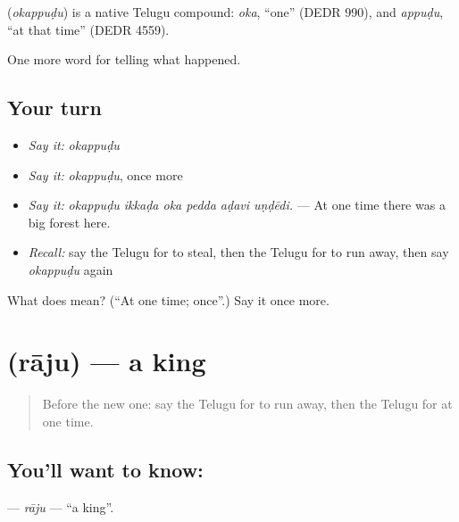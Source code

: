 \begin{cousinweb}
\textbf{} (\emph{okappuḍu}) is a native Telugu compound: \emph{oka}, \textquotedblleft{}one\textquotedblright{} (DEDR 990), and \emph{appuḍu}, \textquotedblleft{}at that time\textquotedblright{} (DEDR 4559).
\end{cousinweb}

\begin{grammarlens}[title={What you've built}]
One more word for telling what happened.
\end{grammarlens}

\subsection*{Your turn}
\begin{itemize}
\raggedright
  \item \emph{Say it:} \emph{okappuḍu}
  \item \emph{Say it:} \emph{okappuḍu}, once more
  \item \emph{Say it:} \emph{okappuḍu ikkaḍa oka pedda aḍavi uṇḍēdi.} — At one time there was a big forest here.
  \item \emph{Recall:} say the Telugu for to steal, then the Telugu for to run away, then say \emph{okappuḍu} again
\end{itemize}

\begin{tcolorbox}[breakable,colback=teal!4,colframe=teal!35!black,title={Before you move on}]
What does  mean? (\textquotedblleft{}At one time; once\textquotedblright{}.) Say it once more.
\end{tcolorbox}
\section[\texorpdfstring{\te{రాజు} (rāju)}{రాజు (rāju)}]{ (rāju) — a king}

\label{lesson:TE-C327-raju}



\begin{quote}
Before the new one: say the Telugu for to run away, then the Telugu for at one time.
\end{quote}

\subsection*{You'll want to know: }
\textbf{} — \emph{rāju} — \textquotedblleft{}a king\textquotedblright{}.

